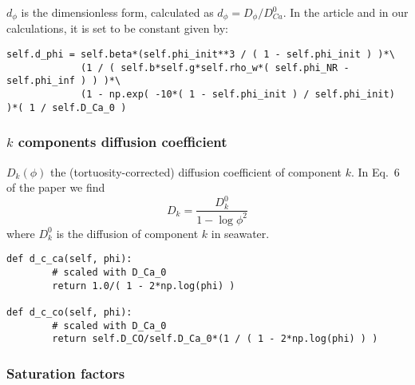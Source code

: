 \documentclass[a4paper]{article}
\begin{document}
$d_\phi$ is the dimensionless form, calculated as $d_\phi=D_\phi/D^0_{Ca}$.
In the article and in our calculations, it is set to be constant given by:

\begin{lstlisting}
self.d_phi = self.beta*(self.phi_init**3 / ( 1 - self.phi_init ) )*\ 
             (1 / ( self.b*self.g*self.rho_w*( self.phi_NR - self.phi_inf ) ) )*\ 
             (1 - np.exp( -10*( 1 - self.phi_init ) / self.phi_init) )*( 1 / self.D_Ca_0 )
\end{lstlisting}

\subsubsection*{$k$ components diffusion coefficient}

$D_k(\phi)$ the (tortuosity-corrected) diffusion
coefficient of component $k$.
In Eq.~6 of the paper we find 
\[
D_k = \frac{D_k^0}{1- \log \phi^2}
\]
where $D_k^0$ is the diffusion of component $k$ in seawater.

\begin{lstlisting}
def d_c_ca(self, phi):
        # scaled with D_Ca_0
        return 1.0/( 1 - 2*np.log(phi) )

def d_c_co(self, phi):
        # scaled with D_Ca_0
        return self.D_CO/self.D_Ca_0*(1 / ( 1 - 2*np.log(phi) ) )
\end{lstlisting}




\subsubsection*{Saturation factors}
\end{document}
